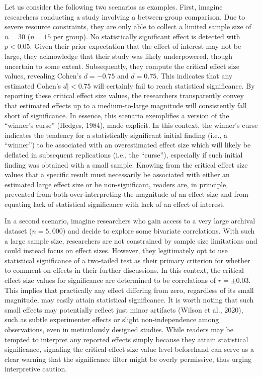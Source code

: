 \documentclass[
  man]{apa7}
\begin{document}
Let us consider the following two scenarios as examples. First, imagine researchers conducting a study involving a between-group comparison. Due to severe resource constraints, they are only able to collect a limited sample size of \(n = 30\) (\(n = 15\) per group). No statistically significant effect is detected with \(p < 0.05\). Given their prior expectation that the effect of interest may not be large, they acknowledge that their study was likely underpowered, though uncertain to some extent. Subsequently, they compute the critical effect size values, revealing Cohen's \(d = -0.75\) and \(d = 0.75\). This indicates that any estimated \textbar Cohen's \(d| < 0.75\) will certainly fail to reach statistical significance. By reporting these critical effect size values, the researchers transparently convey that estimated effects up to a medium-to-large magnitude will consistently fall short of significance. In essence, this scenario exemplifies a version of the ``winner's curse'' (Hedges, 1984), made explicit. In this context, the winner's curse indicates the tendency for a statistically significant initial finding (i.e., a ``winner'') to be associated with an overestimated effect size which will likely be deflated in subsequent replications (i.e., the ``curse''), especially if such initial finding was obtained with a small sample. Knowing from the critical effect size values that a specific result must necessarily be associated with either an estimated large effect size or be non-significant, readers are, in principle, prevented from both over-interpreting the magnitude of an effect size and from equating lack of statistical significance with lack of an effect of interest.

In a second scenario, imagine researchers who gain access to a very large archival dataset (\(n = 5,000\)) and decide to explore some bivariate correlations. With such a large sample size, researchers are not constrained by sample size limitations and could instead focus on effect sizes. However, they legitimately opt to use statistical significance of a two-tailed test as their primary criterion for whether to comment on effects in their further discussions. In this context, the critical effect size values for significance are determined to be correlations of \(r = \pm 0.03\). This implies that practically any effect differing from zero, regardless of its small magnitude, may easily attain statistical significance. It is worth noting that such small effects may potentially reflect just minor artifacts (Wilson et al., 2020), such as subtle experimenter effects or slight non-independence among observations, even in meticulously designed studies. While readers may be tempted to interpret any reported effects simply because they attain statistical significance, signaling the critical effect size value level beforehand can serve as a clear warning that the significance filter might be overly permissive, thus urging interpretive caution.
\end{document}
